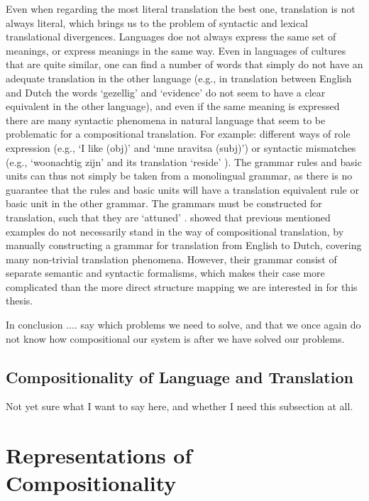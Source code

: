 \documentclass{report}
\newcommand\textcyr[1]{{\fontencoding{OT2}\fontfamily{wncyr}\selectfont #1}}
\theoremstyle{break}
\begin{document}
Even when regarding the most literal translation the best one, translation is not always literal, which brings us to the problem of syntactic and lexical translational divergences. Languages doe not always express the same set of meanings, or express meanings in the same way. Even in languages of cultures that are quite similar, one can find a number of words that simply do not have an adequate translation in the other language (e.g., in translation between English and Dutch the words `gezellig' and `evidence' do not seem to have a clear equivalent in the other language), and even if the same meaning is expressed there are many syntactic phenomena in natural language that seem to be problematic for a compositional translation. For example: different ways of role expression (e.g., `I like (obj)' and `\textcyr{mne nravitsa (subj)}') or syntactic mismatches (e.g., `woonachtig zijn' and its translation `reside' \citep{landsbergen1989power}).  The grammar rules and basic units can thus not simply be taken from a monolingual grammar, as there is no guarantee that the rules and basic units will have a translation equivalent rule or basic unit in the other grammar. The grammars must be constructed for translation, such that they are `attuned' \citep{rosetta1994compositional}. \cite{rosetta1994compositional} showed that previous mentioned examples do not necessarily stand in the way of compositional translation, by manually constructing a grammar for translation from English to Dutch, covering many non-trivial translation phenomena. However, their grammar consist of separate semantic and syntactic formalisms, which makes their case more complicated than the more direct structure mapping we are interested in for this thesis.

In conclusion .... say which problems we need to solve, and that we once again do not know how compositional our system is after we have solved our problems.

\subsection{Compositionality of Language and Translation}

Not yet sure what I want to say here, and whether I need this subsection at all.

\section{Representations of Compositionality}
\end{document}
